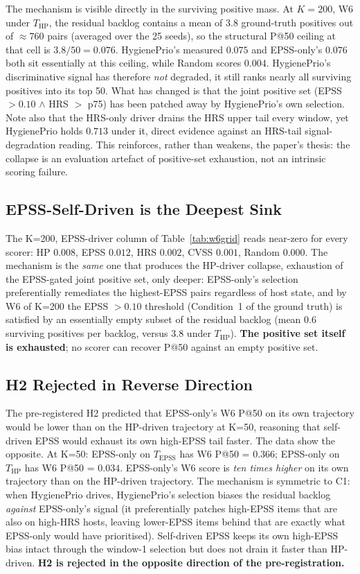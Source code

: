 The mechanism is visible directly in the surviving positive mass. At
$K = 200$, W6 under $T_{\mathrm{HP}}$, the residual backlog contains a
mean of $3.8$ ground-truth positives out of $\approx 760$ pairs
(averaged over the 25 seeds), so the structural P@50 ceiling at that
cell is $3.8 / 50 = 0.076$. HygienePrio's measured $0.075$ and
EPSS-only's $0.076$ both sit essentially at this ceiling, while Random
scores $0.004$. HygienePrio's discriminative signal has therefore
\textit{not} degraded, it still ranks nearly all surviving
positives into its top 50. What has changed is that the joint
positive set (EPSS $> 0.10$ $\wedge$ HRS $>$ p75) has been patched
away by HygienePrio's own selection. Note also that the HRS-only
driver drains the HRS upper tail every window, yet HygienePrio holds
$0.713$ under it, direct evidence against an HRS-tail
signal-degradation reading. This reinforces, rather than weakens, the
paper's thesis: the collapse is an evaluation artefact of positive-set
exhaustion, not an intrinsic scoring failure.

\subsection{EPSS-Self-Driven is the Deepest Sink}

The K=200, EPSS-driver column of Table~\ref{tab:w6grid} reads
near-zero for every scorer: HP $0.008$, EPSS $0.012$, HRS $0.002$,
CVSS $0.001$, Random $0.000$. The mechanism is the \textit{same} one
that produces the HP-driver collapse, exhaustion of the EPSS-gated
joint positive set, only deeper: EPSS-only's selection
preferentially remediates the highest-EPSS pairs regardless of host
state, and by W6 of K=200 the EPSS $> 0.10$ threshold (Condition~1 of
the ground truth) is satisfied by an essentially empty subset of the
residual backlog (mean $0.6$ surviving positives per backlog, versus
$3.8$ under $T_{\mathrm{HP}}$). \textbf{The positive set itself is
exhausted}; no scorer can recover P@50 against an empty positive set.

\subsection{H2 Rejected in Reverse Direction}

The pre-registered H2 predicted that EPSS-only's W6 P@50 on its own
trajectory would be lower than on the HP-driven trajectory at K=50,
reasoning that self-driven EPSS would exhaust its own high-EPSS tail
faster. The data show the opposite. At K=50:
EPSS-only on $T_{\mathrm{EPSS}}$ has W6 P@50 = $0.366$;
EPSS-only on $T_{\mathrm{HP}}$ has W6 P@50 = $0.034$.
EPSS-only's W6 score is \textit{ten times higher} on its own trajectory
than on the HP-driven trajectory. The mechanism is symmetric to C1:
when HygienePrio drives, HygienePrio's selection biases the residual
backlog \textit{against} EPSS-only's signal (it preferentially patches
high-EPSS items that are also on high-HRS hosts, leaving lower-EPSS
items behind that are exactly what EPSS-only would have prioritised).
Self-driven EPSS keeps its own high-EPSS bias intact through the
window-1 selection but does not drain it faster than HP-driven.
\textbf{H2 is rejected in the opposite direction of the pre-registration.}

